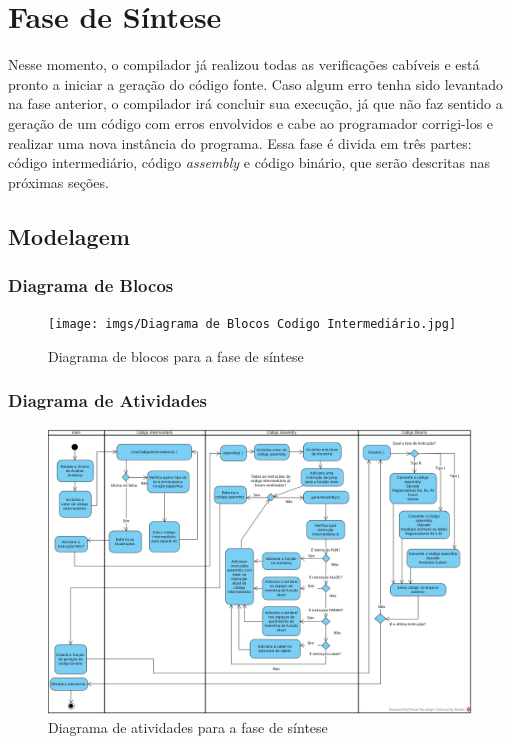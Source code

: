 \documentclass[
	12pt,				%
	oneside,
	a4paper,			%
	english,			%
	french,				%
	spanish,			%
	brazil,				%
	]{abntex2}
\begin{document}
\section{Fase de Síntese}

Nesse momento, o compilador já realizou todas as verificações cabíveis e está pronto a iniciar a geração do código fonte. Caso algum erro tenha sido levantado na fase anterior, o compilador irá concluir sua execução, já que não faz sentido a geração de um código com erros envolvidos e cabe ao programador corrigi-los e realizar uma nova instância do programa. Essa fase é divida em três partes: código intermediário, código \emph{assembly} e código binário, que serão descritas nas próximas seções.

\subsection{Modelagem}

\subsubsection{Diagrama de Blocos}

\begin{figure}[H]
\centering 
\caption{Diagrama de blocos para a fase de síntese} \label{fig:DiagramaBlocosSintese}
\graphicspath{ {./imgs/} } 
\texttt{[image: imgs/Diagrama de Blocos Codigo Intermediário.jpg]}
\end{figure}


\subsubsection{Diagrama de Atividades}

\begin{figure}[H]
\centering 
\caption{Diagrama de atividades para a fase de síntese} \label{fig:DiagramaAtividadesSintese}
\graphicspath{ {./imgs/} } 
\includegraphics[scale=0.3]{imgs/Diagrama de Atividades Código Intermediário.jpg}
\end{figure}
\end{document}
